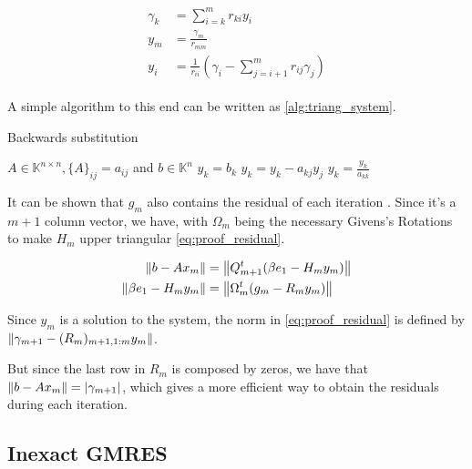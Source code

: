 \begin{align}\label{eq:triangular_system}
    \begin{split}
        \gamma_{k} &= \sum_{i=k}^{m} r_{ki} y_{i}\\
        y_{m} &= \frac{\gamma_{m}}{r_{mm}} \\
        y_{i} &= \frac{1}{r_{ii}} \left( \gamma_{i} - \sum_{j=i+1}^{m} r_{ij} \gamma_{j}  \right)
    \end{split}
\end{align}

A simple algorithm to this end can be written as \ref{alg:triang_system}.

\begin{algorithm}
    \caption{Backwards substitution}\label{alg:triang_system}
    \begin{algorithmic}[1]
        \State $A \in \mathbb{K}^{n \times n}, \{ A \}_{ij} = a_{ij}$ and $b\in \mathbb{K}^{n}$
        \State $y_{k} = b_{k}$
        \State $y_{k} = y_{k} - a_{kj}y_{j}$
        \EndFor
        \State $y_{k} = \frac{y_{k}}{a_{kk}}$
        \EndFor
    \end{algorithmic}
\end{algorithm}



It can be shown that $g_{m}$ also contains the residual of each iteration \cite{saad2003iterative}. Since it's a $m+1$ column vector, we have, with $\Omega_{m}$ being the necessary Givens's Rotations to make $H_{m}$ upper triangular \ref{eq:proof_residual}.

\begin{align}\label{eq:proof_residual}
    \begin{split}
        \left\lVert b - Ax_{m}\right\rVert & = \left\lVert Q_{m+1}^{t}(\beta e_{1} - H_{m}y_{m})\right\rVert\\
        \left\lVert\beta e_{1} - H_{m}y_{m}\right\rVert &= \left\lVert\Omega_{m}^{t} (g_{m} - R_{m}y_{m})\right\rVert
    \end{split}
\end{align}

Since $y_{m}$ is a solution to the system, the norm in \ref{eq:proof_residual} is defined by $\left\lVert\gamma_{m+1} - (R_{m})_{m+1,1:m} y_{m}\right\rVert$.

But since the last row in $R_{m}$ is composed by zeros, we have that $\left\lVert b - Ax_{m}\right\rVert = |\gamma_{m+1}|$, which gives a more efficient way to obtain the residuals during each iteration.


\subsection{Inexact GMRES}

